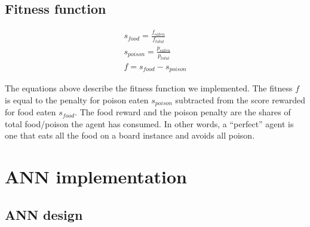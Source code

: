 \documentclass[twoside]{article}
\begin{document}
\begin{multicols}{2}
  \subsection{Fitness function}

  \begin{gather*}
    s_{food} = \frac{f_{eaten}}{f_{total}} \\[10pt]
    s_{poison} = \frac{p_{eaten}}{p_{total}} \\[10pt]
    f = s_{food} - s_{poison}
  \end{gather*}

  The equations above describe the fitness function we implemented.
  The fitness $f$ is equal to the penalty for poison eaten $s_{poison}$ subtracted from the score rewarded for food eaten $s_{food}$.
  The food reward and the poison penalty are the shares of total food/poison the agent has consumed.
  In other words, a ``perfect'' agent is one that eats all the food on a board instance and avoids all poison.

  \newpage
  \section{ANN implementation}

  \subsection{ANN design}

  \def\layersep{2.0cm}
  

  \begin{figure}[H]
    \centering
\end{figure}
\end{multicols}
\end{document}
